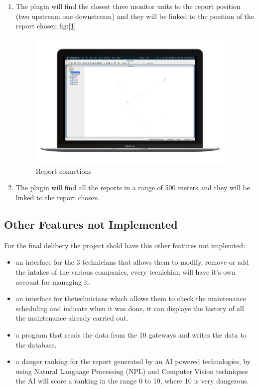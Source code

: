 \begin{enumerate}
    \item The plugin will find the closest three monitor units to the report position (two upstream one downstream) and they will be linked to the position of the report chosen fig:[\ref{optuTorial3}].
    \begin{figure}[H]
        \centering
        \includegraphics[width=27em]{img/op3.png} \caption{Report connetions} \label{optuTorial3}
    \end{figure}

    \item The plugin will find all the reports in a range of 500 meters and they will be linked to the report chosen.
\end{enumerate}



\subsection{Other Features not Implemented}

For the final delibery the project shold have this other features not implemted:

\begin{itemize}
    \item an interface for the 3 technicians that allows them to modify, remove or add the intakes of the various companies, every tecnichian will have it's own account for managing it.
    \item an interface for thetechnicians which allows them to check the maintenance scheduling and indicate when it was done, it can displaye the history of all the maintenance already carried out.
    \item a program that reads the data from the 10 gateways and writes the data to the database.
    \item a danger ranking for the report generated by an AI powered technologies, by using Natural Language Processing (NPL) and Computer Vision techniques the AI will score a ranking in the range 0 to 10, where 10 is very dangerous.
\end{itemize}

